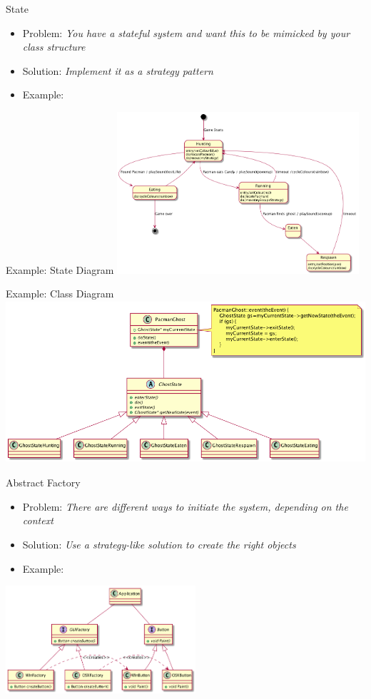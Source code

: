 \documentclass[10pt,t,a4paper]{beamer}
\begin{document}
\begin{frame}[label={sec:orgheadline15}]{State}
\begin{itemize}
\item Problem: \emph{You have a stateful system and want this to be mimicked by your class structure}
\item Solution: \emph{Implement it as a strategy pattern}
\item Example:
\end{itemize}
\end{frame}
\begin{frame}[label={sec:orgheadline16}]{Example: State Diagram}
\includegraphics[height=6cm]{FState0.png}
\end{frame}
\begin{frame}[label={sec:orgheadline17}]{Example: Class Diagram}
\includegraphics[height=6cm]{FState1.png}
\end{frame}

\begin{frame}[label={sec:orgheadline18}]{Abstract Factory}
\begin{itemize}
\item Problem: \emph{There are different ways to initiate the system, depending on the context}
\item Solution: \emph{Use a strategy-like solution to create the right objects}
\item Example:
\end{itemize}
\includegraphics[height=4cm]{FAbstractFactory.png}
\end{frame}
\end{document}

